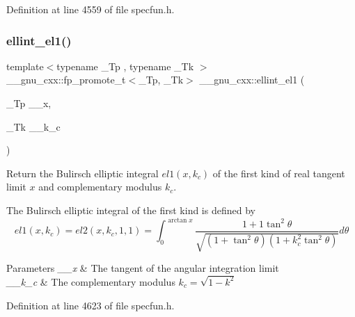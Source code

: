 Definition at line 4559 of file specfun.\+h.

\mbox{\label{group__gnu__math__spec__func_ga510b1e51e7d3bc937ed1b4c2f57492e4}} 
\subsubsection{\texorpdfstring{ellint\+\_\+el1()}{ellint\_el1()}}
{\footnotesize\ttfamily template$<$typename \+\_\+\+Tp , typename \+\_\+\+Tk $>$ \\
\+\_\+\+\_\+gnu\+\_\+cxx\+::fp\+\_\+promote\+\_\+t$<$\+\_\+\+Tp, \+\_\+\+Tk$>$ \+\_\+\+\_\+gnu\+\_\+cxx\+::ellint\+\_\+el1 (\begin{DoxyParamCaption}\item[{\+\_\+\+Tp}]{\+\_\+\+\_\+x,  }\item[{\+\_\+\+Tk}]{\+\_\+\+\_\+k\+\_\+c }\end{DoxyParamCaption})\hspace{0.3cm}{\ttfamily [inline]}}

Return the Bulirsch elliptic integral $ el1(x,k_c) $ of the first kind of real tangent limit $ x $ and complementary modulus $ k_c $.

The Bulirsch elliptic integral of the first kind is defined by \[ el1(x,k_c) = el2(x,k_c,1,1) = \int_0^{\arctan x} \frac{1+1\tan^2\theta} {\sqrt{(1+\tan^2\theta)(1+k_c^2\tan^2\theta)}}d\theta \]


\begin{DoxyParams}{Parameters}
{\em \+\_\+\+\_\+x} & The tangent of the angular integration limit \\
\hline
{\em \+\_\+\+\_\+k\+\_\+c} & The complementary modulus $ k_c = \sqrt{1 - k^2} $ \\
\hline
\end{DoxyParams}


Definition at line 4623 of file specfun.\+h.

\mbox{\label{group__gnu__math__spec__func_ga8d8342bb4f42c7fe09b5589c54d4e713}} 
